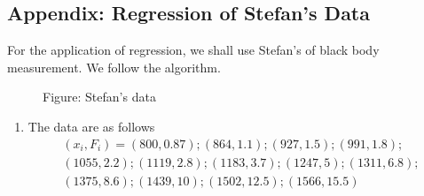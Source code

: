 \documentclass[../../../main.tex]{subfiles}
\begin{document}
\subsection{Appendix: Regression of Stefan's Data}
For the application of regression, we shall use Stefan's of black body measurement.
We follow the algorithm.

\begin{figure}[h]
    \centering
    \caption*{Figure: Stefan's data}
\end{figure}

\begin{enumerate}
    \item The data are as follows
          \begin{multline*}
              (x_i,F_i)= (800, 0.87); (864, 1.1); (927, 1.5); (991, 1.8);\\
              (1055, 2.2); (1119, 2.8); (1183, 3.7); (1247, 5); (1311, 6.8);\\
              (1375, 8.6); (1439, 10); (1502, 12.5); (1566, 15.5)
          \end{multline*}



\end{enumerate}
\end{document}
